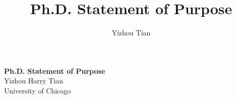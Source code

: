 \documentclass[11pt]{article}
\title{Ph.D. Statement of Purpose}
\author{Yizhou Tian}
\affil{University of Chicago}
\newcommand\todo[1]{\textcolor{blue}{#1}}
\begin{document}



\begin{center}
    {\Large{\textbf{Ph.D. Statement of Purpose }}}\\
    Yizhou Harry Tian\\
     University of Chicago\\
\end{center}









\clearpage


% 
% 
\end{document}
